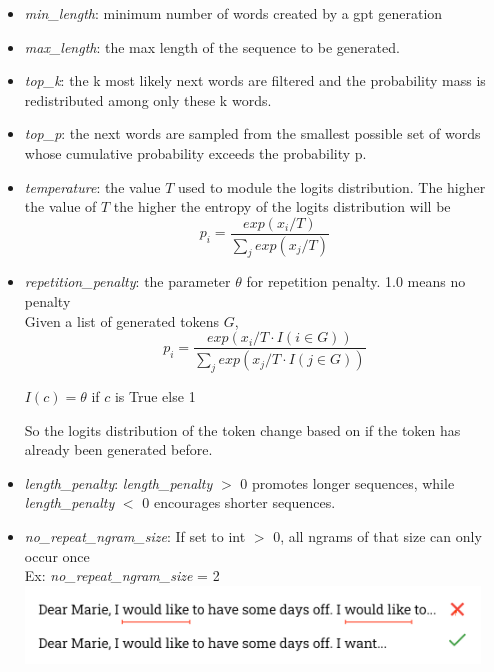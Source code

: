\begin{itemize}
    \item \textit{min\_length}: minimum number of words created by a gpt generation
    \item \textit{max\_length}: the max length of the sequence to be generated.  
    \item \textit{top\_k}: the k most likely next words are filtered and the probability mass is redistributed among only these k words.
    \item \textit{top\_p}: the next words are sampled from the smallest possible set of words whose cumulative probability exceeds the probability p.
    \item \textit{temperature}: the value $T$ used to module the logits distribution. The higher the value of $T$ the higher the entropy of the logits distribution will be
    \begin{equation*}
        p_i = \frac{exp(x_i/T)}{\sum_j exp(x_j/T)}   
    \end{equation*}
    \item \textit{repetition\_penalty}: the parameter $\theta$ for repetition penalty. 1.0 means no penalty \\
    Given a list of generated tokens $G$, 
     \begin{equation*}
        p_i = \frac{exp(x_i/T \cdot I(i \in G))}{\sum_j exp(x_j/T \cdot I(j \in G))}
    \end{equation*}
    \begin{center}
    $I(c) = \theta$ if $c$ is True else 1
    \end{center}

    So the logits distribution of the token change based on if the token has already been generated before.

    \item \textit{length\_penalty}: \textit{length\_penalty} $>$ 0 promotes longer sequences, while \linebreak 
    \textit{length\_penalty} $<$ 0 encourages shorter sequences.

    \item \textit{no\_repeat\_ngram\_size}: If set to int $>$ 0, all ngrams of that size can only occur once \\
    Ex: \textit{no\_repeat\_ngram\_size} = 2 \\
    \includegraphics[width=0.95\textwidth]{images/no_ngram_thesis.drawio.png}


\end{itemize}
